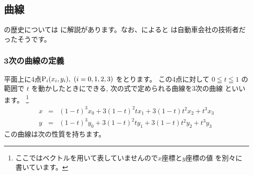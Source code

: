 \subsection{\Bezier 曲線}
の歴史については
\cite[p.13--14]{Metafont}に解説があります。なお、\cite[28ページ]{Cox}によると
\Bezier は自動車会社の技術者だったそうです。
\subsubsection{3次の\Bezier 曲線の定義}
平面上に4点${\rm P}_i(x_i,y_i),\ (i=0,1,2,3)$ をとります。
この4点に対して $0\leqq t \leqq 1$ の範囲で
$t$ を動かしたときにできる, 次の式で定められる曲線を$3$次の\Bezier 曲線
といいます。
\footnote{ここではベクトルを用いて表していませんので$x$座標と$y$座標の値
を別々に書いています。}
\begin{eqnarray}
 x&=&(1-t)^3x_0+3(1-t)^2tx_1+3(1-t)t^2x_2+t^3x_3\label{Bezierx}\\
 y&=&(1-t)^3y_0+3(1-t)^2ty_1+3(1-t)t^2y_2+t^3y_3\label{Beziery}
\end{eqnarray}
この曲線は次の性質を持ちます。
